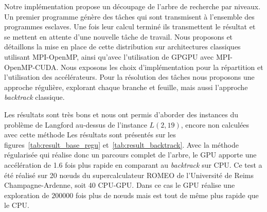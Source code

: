 \documentclass[12pt,a4paper]{report}
\begin{document}
Notre implémentation propose un découpage de l'arbre de recherche par niveaux. 
Un premier programme génère des tâches qui sont transmisent à l'ensemble des programmes esclaves. 
Une fois leur calcul terminé ils transmettent le résultat et se mettent en attente d'une nouvelle tâche de travail.
Nous proposons et détaillons la mise en place de cette distribution sur architectures classiques utilisant MPI-OpenMP, ainsi qu'avec l'utilisation de GPGPU avec MPI-OpenMP-CUDA.
Nous exposons les choix d'implémentation pour la répartition et l'utilisation des accélérateurs. 
Pour la résolution des tâches nous proposons une approche régulière, explorant chaque branche et feuille, mais aussi l'approche \textit{backtrack} classique. 

Les résultats sont très bons et nous ont permis d'aborder des instances du problème de Langford au-dessus de l'instance $L(2,19)$, encore non calculées avec cette méthode
Les résultats sont présentés sur les figures~\ref{tab:result_base_regu} et~\ref{tab:result_backtrack}.
Avec la méthode régularisée qui réalise donc un parcours complet de l’arbre, le GPU apporte une accélération de 1.6 fois plus rapide en comparant au \textit{backtrack} sur CPU. 
Ce test a été réalisé sur 20 nœuds du supercalculateur ROMEO de l'Université de Reims Champagne-Ardenne, soit 40 CPU-GPU.
Dans ce cas le GPU réalise une exploration de $200 000$ fois plus de nœuds mais est tout de même plus rapide que le CPU. 
\end{document}
